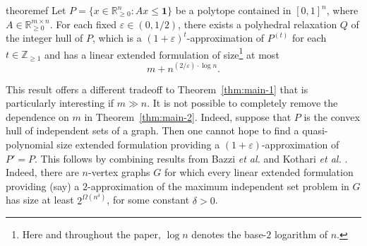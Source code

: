 \documentclass[11pt]{article}
\newcommand{\R}{\mathbb{R}}
\newcommand{\Z}{\mathbb{Z}}
\newcommand{\eps}{\varepsilon}
\newcommand{\numrounds}{t}
\newcommand{\rhs}{\delta}
\theoremstyle{remark}
\begin{document}
\begin{restatable}{theorem}{ef}\label{thm:main-2}
    Let $P = \{x \in \R^n_{\ge 0} : Ax \le \mathbf 1\}$ be a polytope contained in $[0,1]^n$, where $A \in \R_{\geq 0}^{m \times n}$. For each fixed $\eps \in (0,1/2)$, there exists a polyhedral relaxation $Q$ of the integer hull of $P$, which is a $(1+\eps)^\numrounds$-approximation of $P^{(t)}$ for each $t \in \Z_{\ge 1}$ and has a linear extended formulation of size\footnote{Here and throughout the paper, $\log n$ denotes the base-$2$ logarithm of $n$.} at most
    \[
      m + n^{(2/\eps) \cdot \log n}.
    \] 
\end{restatable}

This result offers a different tradeoff to Theorem~\ref{thm:main-1} that is particularly interesting if
$m \gg n$.
It is not possible to completely remove the dependence on $m$ in Theorem~\ref{thm:main-2}. Indeed, suppose that $P$ is the convex hull of independent sets of a graph. Then one cannot hope to find a quasi-polynomial size extended formulation providing a $(1+\eps)$-approximation of $P' = P$. This follows by combining results from Bazzi \emph{et al.} \cite{bfps15} and Kothari \emph{et al.} \cite{kmr17}. Indeed, there are $n$-vertex graphs $G$ for which every linear extended formulation providing (say) a $2$-approximation of the maximum independent set problem in $G$ has size at least $2^{\Omega(n^\rhs)}$, for some constant $\rhs > 0$.








\end{document}
